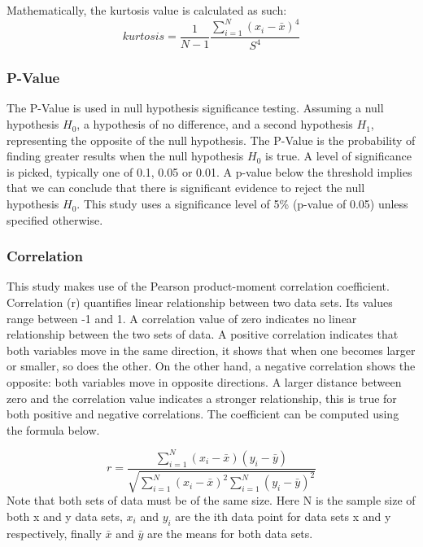 Mathematically, the kurtosis value is calculated as such:
\begin{equation}
    kurtosis = \frac{1}{N - 1} \frac{\sum_{i=1}^{N}(x_{i} - \bar{x})^{4}}{S^{4}}
\end{equation}

\subsubsection{P-Value}

The P-Value is used in null hypothesis significance testing. Assuming a null hypothesis $H_{0}$, a hypothesis of no difference, and a second hypothesis $H_{1}$, representing the opposite of the null hypothesis. The P-Value is the probability of finding greater results when the null hypothesis $H_{0}$ is true. A level of significance is picked, typically one of 0.1, 0.05 or 0.01. A p-value below the threshold implies that we can conclude that there is significant evidence to reject the null hypothesis $H_{0}$. This study uses a significance level of 5\% (p-value of 0.05) unless specified otherwise.

\subsubsection{Correlation}

This study makes use of the Pearson product-moment correlation coefficient. Correlation (r) quantifies linear relationship between two data sets. Its values range between -1 and 1. A correlation value of zero indicates no linear relationship between the two sets of data. A positive correlation indicates that both variables move in the same direction, it shows that when one becomes larger or smaller, so does the other. On the other hand, a negative correlation shows the opposite: both variables move in opposite directions. 
A larger distance between zero and the correlation value indicates a stronger relationship, this is true for both positive and negative correlations. The coefficient can be computed using the formula below.

\begin{equation}
    r = \frac{\sum_{i=1}^{N}(x_{i} - \bar{x})(y_{i} - \bar{y})}{\sqrt{\sum_{i=1}^{N}(x_{i} - \bar{x})^{2}\sum_{i=1}^{N}(y_{i} - \bar{y})^{2}}}
\end{equation}
Note that both sets of data must be of the same size. Here N is the sample size of both x and y data sets, $x_{i}$ and $y_{i}$ are the ith data point for data sets x and y respectively, finally $\bar{x}$ and $\bar{y}$ are the means for both data sets.

